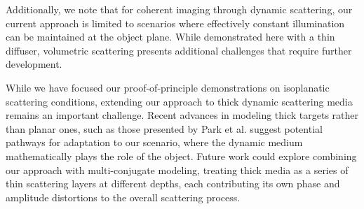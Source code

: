 \documentclass[pdflatex,sn-mathphys-num]{sn-jnl}%
\theoremstyle{thmstyleone}%
\theoremstyle{thmstyletwo}%
\theoremstyle{thmstylethree}%
\begin{document}


Additionally, we note that for coherent imaging through dynamic scattering, our current approach is limited to scenarios where effectively constant illumination can be maintained at the object plane. While demonstrated here with a thin diffuser, volumetric scattering presents additional challenges that require further development.

While we have focused our proof-of-principle demonstrations on isoplanatic scattering conditions, extending our approach to thick dynamic scattering media remains an important challenge. Recent advances in modeling thick targets rather than planar ones, such as those presented by Park et al. \cite{oh2025digital} suggest potential pathways for adaptation to our scenario, where the dynamic medium mathematically plays the role of the object. Future work could explore combining our approach with multi-conjugate modeling, treating thick media as a series of thin scattering layers at different depths, each contributing its own phase and amplitude distortions to the overall scattering process.
\end{document}
